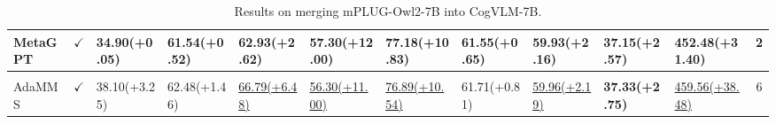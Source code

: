 \begin{table*}[!ht]
{\begin{tabular}{lclllllllllc}
        MetaGPT & $\checkmark$& 34.90\footnotesize(+0.05) & 61.54\footnotesize(+0.52) & 62.93\footnotesize(+2.62) & \textbf{57.30\footnotesize(+12.00)} & \textbf{77.18\footnotesize(+10.83)} & 61.55\footnotesize(+0.65) & 59.93\footnotesize(+2.16) & 37.15\footnotesize(+2.57) & 452.48\footnotesize(+31.40) &2
          \\[0.5ex] 
        
       \hline
       
\rowcolor{gray!20}
\multicolumn{12}{c}{\textbf{Our Method}} \\
\hline 
                      
      AdaMMS &$\checkmark$& 38.10\footnotesize(+3.25) & 62.48\footnotesize(+1.46) & \underline{66.79\footnotesize(+6.48)} & \underline{56.30\footnotesize(+11.00)} & \underline{76.89\footnotesize(+10.54)} & 61.71\footnotesize(+0.81) & \underline{59.96\footnotesize(+2.19)} & \textbf{37.33\footnotesize(+2.75)} & \underline{459.56\footnotesize(+38.48)} &6  \\
        \bottomrule
    \end{tabular}%
        }
    \caption{Results on merging mPLUG-Owl2-7B into CogVLM-7B.}
    \label{tab:mplug2cog}
\end{table*}


